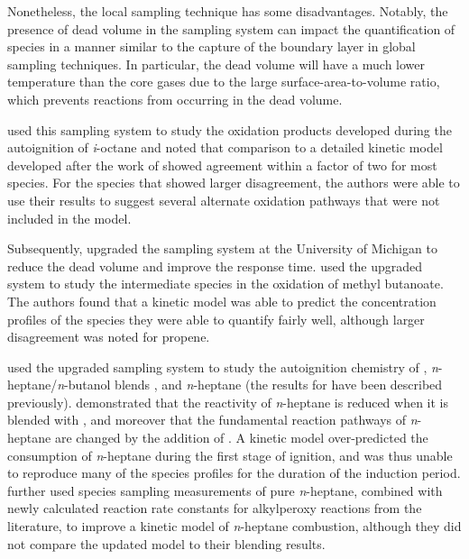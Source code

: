 \documentclass[../main.tex]{subfiles}
\begin{document}
Nonetheless, the local sampling technique has some disadvantages.
Notably, the presence of dead volume in the sampling system can impact
the quantification of species in a manner similar to the capture of the
boundary layer in global sampling techniques. In particular, the dead
volume will have a much lower temperature than the core gases due to the
large surface-area-to-volume ratio, which prevents reactions from
occurring in the dead volume.

\textcite{He2007} used this sampling system to study the oxidation
products developed during the autoignition of \textit{i}-octane and noted
that comparison to a detailed kinetic model developed after the work of
\textcite{Minetti1996} showed agreement within a factor of two for most
species. For the species that showed larger disagreement, the authors
were able to use their results to suggest several alternate oxidation
pathways that were not included in the model.

Subsequently, \textcite{Walton2008} upgraded the sampling system at the
University of Michigan to reduce the dead volume and improve the
response time. \textcite{Walton2011} used the upgraded system to study
the intermediate species in the oxidation of methyl butanoate. The
authors found that a kinetic model was able to predict the concentration
profiles of the species they were able to quantify fairly well, although
larger disagreement was noted for propene.

\textcite{Karwat2011a, Karwat2012, Karwat2013} used the upgraded
sampling system to study the autoignition chemistry of \nBuOH{}
\cite{Karwat2011a}, \textit{n}-heptane/\textit{n}-butanol blends
\cite{Karwat2012}, and \textit{n}-heptane \cite{Karwat2013} (the results
for \nBuOH{} have been described previously). \textcite{Karwat2012}
demonstrated that the reactivity of \textit{n}-heptane is reduced when
it is blended with \nBuOH{}, and moreover that the fundamental reaction
pathways of \textit{n}-heptane are changed by the addition of \nBuOH{}.
A kinetic model over-predicted the consumption of \textit{n}-heptane
during the first stage of ignition, and was thus unable to reproduce many
of the species profiles for the duration of the induction period.
\textcite{Karwat2013} further used species sampling measurements of pure
\textit{n}-heptane, combined with newly calculated reaction rate constants
for alkylperoxy reactions from the literature, to improve a kinetic
model of \textit{n}-heptane combustion, although they did not compare the
updated model to their blending results.
\end{document}
